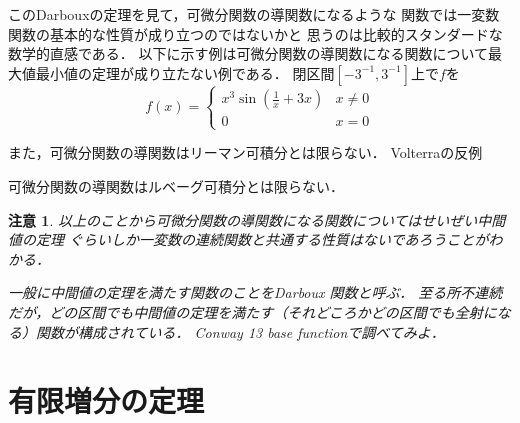 \documentclass[leqno, a4paper, 12pt]{jsarticle}
\newtheorem*{rmk}{注意}
\begin{document}
このDarbouxの定理を見て，可微分関数の導関数になるような
関数では一変数関数の基本的な性質が成り立つのではないかと
思うのは比較的スタンダードな数学的直感である．
以下に示す例は可微分関数の導関数になる関数について最大値最小値の定理が成り立たない例である．
\cite[p.165]{tazi}
閉区間$[-3^{-1}, 3^{-1}]$上で$f$を
\[
f(x)=
\begin{cases}
\displaystyle x^{3}\sin\left(\frac{1}{x}+3x\right) & \text{$x\neq 0$}\\
0 & \text{$x=0$}
\end{cases}
\]

また，可微分関数の導関数はリーマン可積分とは限らない．
Volterraの反例

可微分関数の導関数はルベーグ可積分とは限らない．




\begin{rmk}
以上のことから可微分関数の導関数になる関数についてはせいぜい中間値の定理
ぐらいしか一変数の連続関数と共通する性質はないであろうことがわかる．

一般に中間値の定理を満たす関数のことをDarboux 関数と呼ぶ．
至る所不連続だが，どの区間でも中間値の定理を満たす（それどころかどの区間でも全射になる）関数が構成されている．
Conway 13 base functionで調べてみよ．
\end{rmk}


\section{有限増分の定理}
\end{document}

